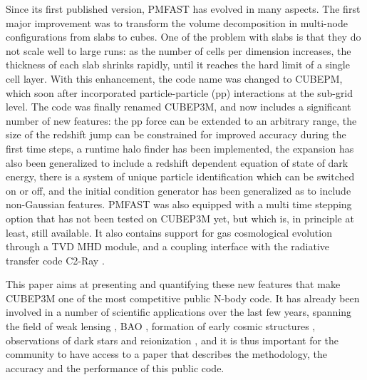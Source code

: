 Since its first published version, {\small PMFAST} has evolved in many aspects. 
The first major improvement was to transform the volume decomposition in multi-node configurations 
from slabs to cubes. One of the problem with slabs is that they do not scale well to large runs: 
as the number of cells per dimension increases, the thickness of each slab shrinks rapidly,
until it reaches the hard limit of a single cell layer.  With this enhancement, the code name was changed to {\small CUBEPM},
which soon after incorporated particle-particle (pp) interactions at the sub-grid level. 
The code was finally renamed {\small CUBEP3M}, and now includes a significant number of new features: the pp force
can be extended to an arbitrary range, the size of the redshift jump can be constrained for improved accuracy during the first time steps,
a runtime halo finder has been implemented, the expansion has also been generalized to include a redshift dependent equation of state of dark energy, there is a system of unique particle identification which can be switched on or off, and the initial condition generator has been generalized as to include non-Gaussian features.
 {\small PMFAST} was also equipped with a multi time stepping option that has not been tested on {\small CUBEP3M} yet, but which is, in principle at least, still available. 
 It also contains support for gas cosmological evolution through a TVD MHD module,
 and a coupling interface with the radiative transfer code C2-Ray \citep{2006NewA...11..374M}. 

This paper aims at presenting and quantifying these new features that make {\small CUBEP3M} one of the most competitive public N-body code.
It has already been involved in a number of scientific applications over the last few years,
spanning the field of weak lensing \citep{Vafaei10, 2008MNRAS.388.1819L,  2009arXiv0905.0501D, 2010PhRvD..81l3015L, 2010arXiv1012.0444Y, 2012arXiv1202.2332H},  BAO
 \citep{2010arXiv1008.3506Z,  2011arXiv1106.5548N, 2011arXiv1109.5746H, 2012arXiv1205.4989H}, 
formation of early cosmic structures \citep{2008arXiv0806.2887I,2010arXiv1005.2502I},
observations of dark stars \citep{2010MNRAS.407L..74Z,2012MNRAS.tmp.2794I} and
reionization \citep{2011arXiv1107.4772I,Fernandez:2011ab,2011MNRAS.413.1353F,2012MNRAS.422..926M,Datta:2011hv,2012arXiv1203.0517F},  
and it is thus important for the community to have access to a paper that describes the methodology, the accuracy and the performance of this public code. 


